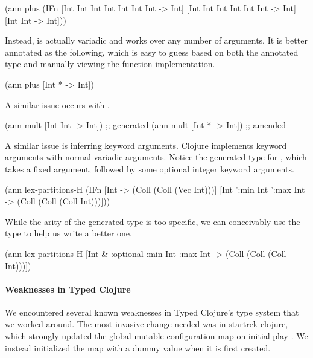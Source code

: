 \begin{cljlisting}
(ann plus (IFn [Int Int Int Int Int Int Int -> Int]
               [Int Int Int Int Int Int -> Int]
               [Int Int -> Int]))
\end{cljlisting}

Instead,  is actually variadic and works over any number of arguments.
It is better annotated as the following, which is easy to guess based on
both the annotated type and manually viewing the function implementation.

\begin{cljlisting}
(ann plus [Int * -> Int])
\end{cljlisting}

A similar issue occurs with .

\begin{cljlisting}
(ann mult [Int Int -> Int]) ;; generated
(ann mult [Int * -> Int])   ;; amended
\end{cljlisting}

A similar issue is inferring keyword arguments. Clojure implements
keyword arguments with normal variadic arguments. Notice
the generated type for ,
which takes a fixed argument, followed by some optional integer keyword
arguments. 

\begin{cljlisting}
(ann lex-partitions-H
  (IFn [Int -> (Coll (Coll (Vec Int)))]
       [Int ':min Int ':max Int 
        -> (Coll (Coll (Coll Int)))]))
\end{cljlisting}

While the arity of the generated type is too specific,
we can conceivably use the type to help us write a better one.

\begin{cljlisting}
(ann lex-partitions-H
  [Int & :optional {:min Int :max Int}
   -> (Coll (Coll (Coll Int)))])
\end{cljlisting}

\paragraph{Weaknesses in Typed Clojure}

We encountered several known weaknesses in Typed Clojure's type system
that we worked around.
%
The most invasive change needed was in startrek-clojure, which
strongly updated the global mutable configuration map on initial
play . We instead initialized the map with a dummy
value when it is first created.

